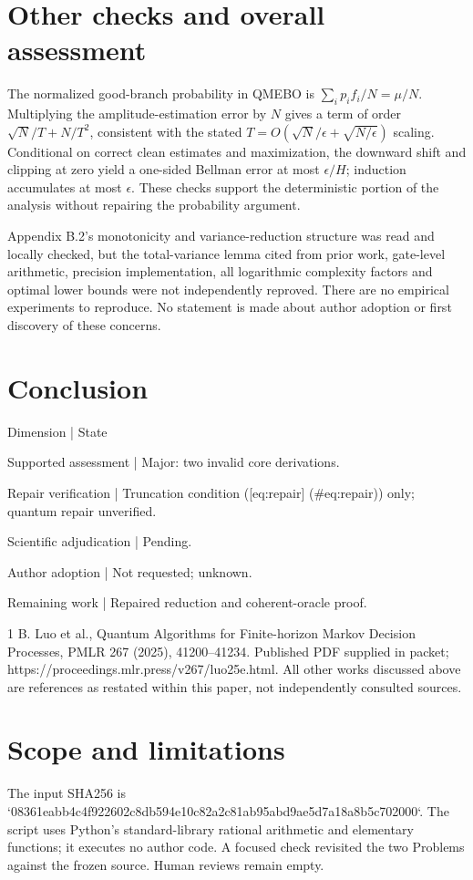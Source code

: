 \documentclass[10pt]{article}
\begin{document}
\section*{Other checks and overall assessment}
The normalized good-branch probability in QMEBO is \(\sum_i p_if_i/N=\mu/N\). Multiplying the amplitude-estimation error by \(N\) gives a term of order \(\sqrt N/T+N/T^2\), consistent with the stated \(T=O(\sqrt N/\epsilon+\sqrt{N/\epsilon})\) scaling. Conditional on correct clean estimates and maximization, the downward shift and clipping at zero yield a one-sided Bellman error at most \(\epsilon/H\); induction accumulates at most \(\epsilon\). These checks support the deterministic portion of the analysis without repairing the probability argument.\par
Appendix B.2’s monotonicity and variance-reduction structure was read and locally checked, but the total-variance lemma cited from prior work, gate-level arithmetic, precision implementation, all logarithmic complexity factors and optimal lower bounds were not independently reproved. There are no empirical experiments to reproduce. No statement is made about author adoption or first discovery of these concerns.\par
\section*{Conclusion}
Dimension | State\par
Supported assessment | Major: two invalid core derivations.\par
Repair verification | Truncation condition ([eq:repair] (\#eq:repair)) only; quantum repair unverified.\par
Scientific adjudication | Pending.\par
Author adoption | Not requested; unknown.\par
Remaining work | Repaired reduction and coherent-oracle proof.\par
1 B. Luo et al., Quantum Algorithms for Finite-horizon Markov Decision Processes, PMLR 267 (2025), 41200–41234. Published PDF supplied in packet; https://proceedings.mlr.press/v267/luo25e.html. All other works discussed above are references as restated within this paper, not independently consulted sources.\par
\section*{Scope and limitations}
The input SHA256 is `08361eabb4c4f922602c8db594e10c82a2c81ab95abd9ae5d7a18a8b5c702000`. The script uses Python’s standard-library rational arithmetic and elementary functions; it executes no author code. A focused check revisited the two Problems against the frozen source. Human reviews remain empty.\par
\end{document}
